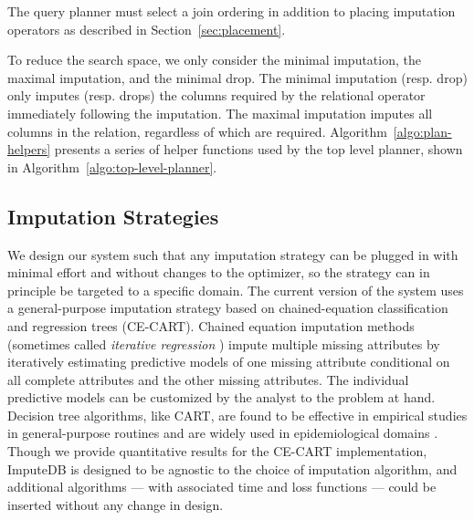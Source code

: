 The query planner must select a join ordering in addition to placing imputation operators as described in Section~\ref{sec:placement}.

To reduce the search space, we only consider the minimal imputation, the maximal imputation, and the minimal drop. The minimal imputation (resp. drop) only imputes (resp. drops) the columns required by the relational operator immediately following the imputation. The maximal imputation imputes all columns in the relation, regardless of which are required.  Algorithm~\ref{algo:plan-helpers} presents
a series of helper functions used by the top level planner, shown in Algorithm~\ref{algo:top-level-planner}.

\begin{algorithm}

\end{algorithm}

\begin{algorithm}

\end{algorithm}

\begin{algorithm}

\end{algorithm}

\subsection{Imputation Strategies}

We design our system such that any imputation strategy can be plugged in with minimal effort
and without changes to the optimizer, so the strategy can in principle be targeted to a
specific domain. The current version of the system uses a general-purpose imputation
strategy based on chained-equation classification and regression trees (CE-CART). Chained
equation imputation methods \cite{vanbuuren2011mice} (sometimes called \textit{iterative
regression} \cite{gelman2006data}) impute multiple missing attributes by
iteratively estimating predictive models of one missing attribute conditional on all
complete attributes and the other missing attributes. The individual predictive models can
be customized by the analyst to the problem at hand. Decision tree algorithms, like CART,
are found to be effective \cite{akande2015empirical} in empirical studies in general-purpose
routines and are widely used in epidemiological domains \cite{burgette2010multiple}. Though
we provide quantitative results for the CE-CART implementation, ImputeDB is designed to be
agnostic to the choice of imputation algorithm, and additional algorithms --- with
associated time and loss functions --- could be inserted without any change in design.

